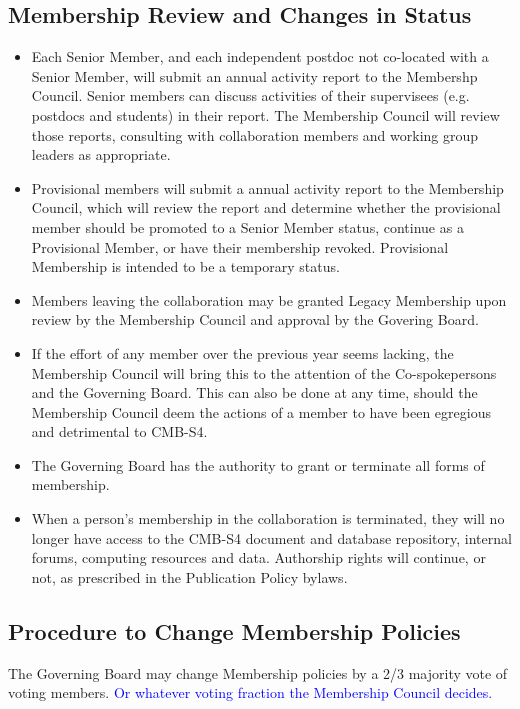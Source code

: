 \subsection{Membership Review and Changes in Status}
\begin{itemize} 

\item Each Senior Member, and each independent postdoc not co-located with a Senior Member, will submit an annual activity report to the Membershp Council.  Senior members can discuss activities of their supervisees (e.g. postdocs and students) in their report. The Membership Council will review those reports, consulting with collaboration members and working group leaders as appropriate.

\item Provisional members will submit a annual activity report to the Membership Council, which will review the report and determine whether the provisional member should be promoted to a Senior Member status, continue as a Provisional Member, or have their membership revoked.  Provisional Membership is intended to be a temporary status.

\item Members leaving the collaboration may be granted Legacy Membership upon review by the Membership Council and approval by the Govering Board.

\item If the effort of any member over the previous year seems lacking, the Membership Council will bring this to the attention of the Co-spokepersons and the Governing Board.  This can also be done at any time, should the Membership Council deem the actions of a member to have been egregious and detrimental to CMB-S4.

\item The Governing Board has the authority to grant or terminate all forms of membership.

\item When a person's membership in the collaboration is terminated, they will no longer have access to the CMB-S4 document and database repository, internal forums, computing resources and data.  Authorship rights will continue, or not, as prescribed in the Publication Policy bylaws.


\end{itemize}

\subsection{Procedure to Change Membership Policies}

The Governing Board may change Membership policies by a 2/3 majority vote of voting members. \textcolor{blue}{Or whatever voting fraction the Membership Council decides.}  



